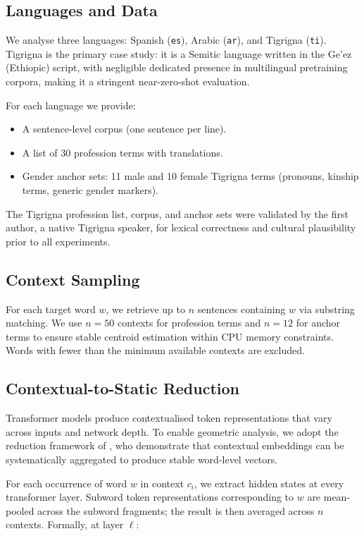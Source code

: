 \documentclass[10pt]{article}
\begin{document}
\subsection{Languages and Data}

We analyse three languages: Spanish (\texttt{es}), Arabic (\texttt{ar}),
and Tigrigna (\texttt{ti}).
Tigrigna is the primary case study: it is a Semitic language written in
the Ge'ez (Ethiopic) script, with negligible dedicated presence in
multilingual pretraining corpora, making it a stringent near-zero-shot
evaluation.

For each language we provide:
\begin{itemize}[noitemsep,leftmargin=*]
  \item A sentence-level corpus (one sentence per line).
  \item A list of 30 profession terms with translations.
  \item Gender anchor sets: 11 male and 10 female Tigrigna terms (pronouns,
        kinship terms, generic gender markers).
\end{itemize}

The Tigrigna profession list, corpus, and anchor sets were validated by the
first author, a native Tigrigna speaker, for lexical correctness and cultural
plausibility prior to all experiments.

\subsection{Context Sampling}

For each target word $w$, we retrieve up to $n$ sentences containing $w$
via substring matching. We use $n=50$ contexts for profession terms and
$n=12$ for anchor terms to ensure stable centroid estimation within CPU
memory constraints. Words with fewer than the minimum available contexts
are excluded.

\subsection{Contextual-to-Static Reduction}

Transformer models produce contextualised token representations that vary
across inputs and network depth. To enable geometric analysis, we adopt the
reduction framework of \citet{bommasani2020reductions}, who demonstrate that
contextual embeddings can be systematically aggregated to produce stable
word-level vectors.

For each occurrence of word $w$ in context $c_i$, we extract hidden states
at every transformer layer. Subword token representations corresponding to
$w$ are mean-pooled across the subword fragments; the result is then averaged
across $n$ contexts. Formally, at layer $\ell$:
\end{document}
